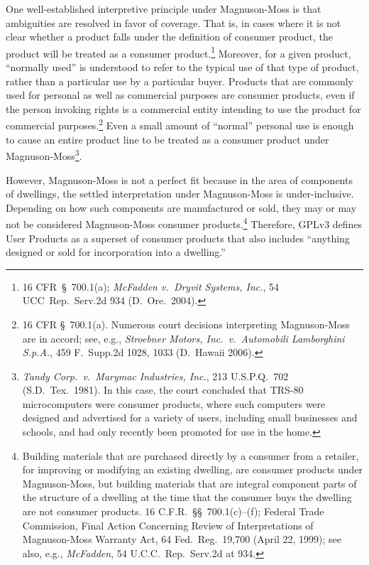 One well-established interpretive principle under Magnuson-Moss is that
ambiguities are resolved in favor of coverage.  That is, in cases where
it is not clear whether a product falls under the definition of consumer
product, the product will be treated as a consumer product.\footnote{16
CFR~\S\ 700.1(a); \textit{McFadden v.~Dryvit Systems, Inc.}, 54
UCC~Rep.~Serv.2d 934 (D.~Ore.~2004).}  Moreover, for a given product,
``normally used'' is understood to refer to the typical use of that type
of product, rather than a particular use by a particular buyer.
Products that are commonly used for personal as well as commercial
purposes are consumer products, even if the person invoking rights is a
commercial entity intending to use the product for commercial
purposes.\footnote{16 CFR \S \ 700.1(a).  Numerous court decisions
interpreting Magnuson-Moss are in accord; see, e.g., \textit{Stroebner
Motors, Inc.~v.~Automobili Lamborghini S.p.A.}, 459 F.~Supp.2d 1028,
1033 (D.~Hawaii 2006).}  Even a small amount of ``normal'' personal use
is enough to cause an entire product line to be treated as a consumer
product under Magnuson-Moss\footnote{\textit{Tandy Corp.~v.~Marymac
Industries, Inc.}, 213 U.S.P.Q.~702 (S.D.~Tex.~1981). In this case, the
court concluded that TRS-80 microcomputers were consumer products, where
such computers were designed and advertised for a variety of users,
including small businesses and schools, and had only recently been
promoted for use in the home.}.

However, Magnuson-Moss is not a perfect fit because in the area of components
of dwellings, the settled interpretation under Magnuson-Moss is under-inclusive.
Depending on how such components are manufactured or sold, they may or may
not be considered Magnuson-Moss consumer products.\footnote{Building
  materials that are purchased directly by a consumer from a retailer, for
  improving or modifying an existing dwelling, are consumer products under
  Magnuson-Moss, but building materials that are integral component parts of
  the structure of a dwelling at the time that the consumer buys the dwelling
  are not consumer products. 16 C.F.R.~\S\S~700.1(c)--(f); Federal Trade
  Commission, Final Action Concerning Review of Interpretations of
  Magnuson-Moss Warranty Act, 64 Fed.~Reg.~19,700 (April 22, 1999); see also,
  e.g., \textit{McFadden}, 54 U.C.C.~Rep.~Serv.2d at 934.}  Therefore, GPLv3
defines User Products as a superset of consumer products that also includes
``anything designed or sold for incorporation into a dwelling.''

